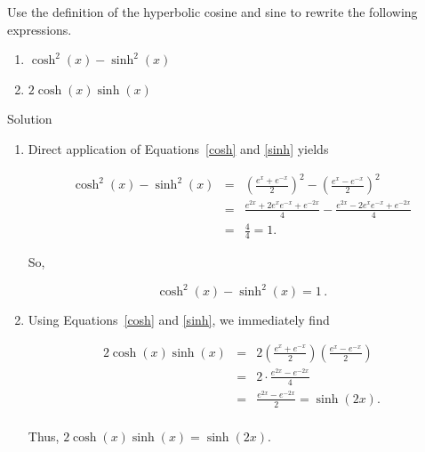 \begin{example}
Use the definition of the hyperbolic cosine and sine to rewrite the following expressions.
\begin{multicols}{2}
\begin{enumerate}
\item		$\cosh^2 (x)-\sinh^2(x)$
\item		$2\cosh (x)\sinh (x)$
\end{enumerate}

\end{multicols}

Solution 

\begin{enumerate}
\item		Direct application of Equations~\eqref{cosh} and \eqref{sinh} yields

\begin{eqnarray*}
 \cosh^2(x)-\sinh^2(x) &=& \left(\frac{e^x+e^{-x}}2\right)^2 -\left(\frac{e^x-e^{-x}}2\right)^2\\
 						&=& \frac{e^{2x}+2e^xe^{-x} + e^{-2x}}4 - \frac{e^{2x}-2e^xe^{-x} + e^{-2x}}4\\
 						&=& \frac44=1.
\end{eqnarray*}

So, 

\begin{equation*}
    \cosh^2 (x)-\sinh^2(x)=1\,.
\end{equation*}

\item Using Equations~\eqref{cosh} and \eqref{sinh}, we immediately find

\allowdisplaybreaks
\begin{eqnarray*}
	2\cosh (x)\sinh (x) &=& 2\left(\frac{e^x+e^{-x}}2\right)\left(\frac{e^x-e^{-x}}2\right) \\
					&=& 2 \cdot\frac{e^{2x} - e^{-2x}}4\\
					&=& \frac{e^{2x} - e^{-2x}}2 = \sinh (2x).\\
			\end{eqnarray*}
			
Thus, $2\cosh (x)\sinh (x) = \sinh (2x)$.


\end{enumerate}
\end{example}

